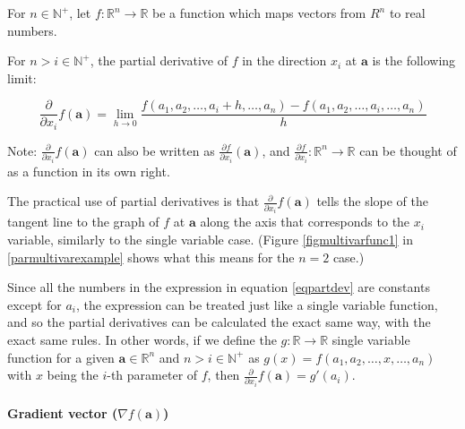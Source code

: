 \documentclass{article}
\begin{document}
          For $n \in \mathbb{N}^+$, let $f : \mathbb{R}^n \rightarrow \mathbb{R}$
          be a function which maps vectors from $R^n$ to real numbers.

          For $n > i \in \mathbb{N}^+$, the partial derivative of $f$ in the
          direction $x_i$ at $\mathbf{a}$ is the following limit:

          \begin{equation} \label{eqpartdev}
            \frac{\partial}{\partial x_i} f(\mathbf{a})
              = \lim_{h \to 0}
                  \frac{
                    f(a_1, a_2, \ldots, a_i + h, \ldots, a_n)
                    - f(a_1, a_2, \ldots, a_i, \ldots, a_n)
                  }{
                    h
                  }
          \end{equation}

          Note: $\frac{\partial}{\partial x_i} f(\mathbf{a})$ can also be
          written as $\frac{\partial f}{\partial x_i} (\mathbf{a})$, and
          $\frac{\partial f}{\partial x_i} : \mathbb{R}^n \rightarrow \mathbb{R}$
          can be thought of as a function in its own right.

          The practical use of partial derivatives is that
          $\frac{\partial}{\partial x_i} f(\mathbf{a})$ tells the slope
          of the tangent line to the graph of $f$ at $\mathbf{a}$ along the
          axis that corresponds to the $x_i$ variable, similarly to the single
          variable case. (Figure \ref{figmultivarfunc1} in
          \ref{parmultivarexample} shows what this means for the $n=2$ case.)

          Since all the numbers in the expression in equation \ref{eqpartdev}
          are constants except for $a_i$, the expression can be treated just
          like a single variable function, and so the partial derivatives can be
          calculated the exact same way, with the exact same rules. In other
          words, if we define the $g : \mathbb{R} \rightarrow \mathbb{R}$
          single variable function for a given $\mathbf{a} \in \mathbb{R}^n$ and
          $n > i \in \mathbb{N}^+$ as
          $g(x) = f(a_1, a_2, \ldots, x, \ldots, a_n)$ with $x$ being the $i$-th
          parameter of $f$, then
          $\frac{\partial}{\partial x_i} f(\mathbf{a}) = g'(a_i)$.

          \paragraph{Gradient vector ($\nabla f(\mathbf{a})$)}
\end{document}
